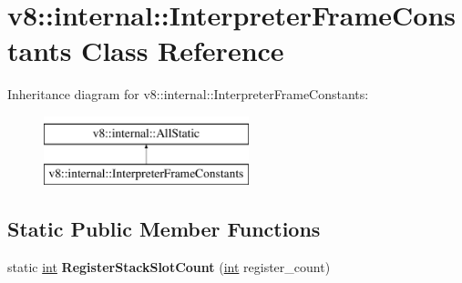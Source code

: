 \hypertarget{classv8_1_1internal_1_1InterpreterFrameConstants}{}\section{v8\+:\+:internal\+:\+:Interpreter\+Frame\+Constants Class Reference}
\label{classv8_1_1internal_1_1InterpreterFrameConstants}
Inheritance diagram for v8\+:\+:internal\+:\+:Interpreter\+Frame\+Constants\+:\begin{figure}[H]
\begin{center}
\leavevmode
\includegraphics[height=2.000000cm]{classv8_1_1internal_1_1InterpreterFrameConstants}
\end{center}
\end{figure}
\subsection*{Static Public Member Functions}
\begin{DoxyCompactItemize}
\item 
\mbox{\label{classv8_1_1internal_1_1InterpreterFrameConstants_a80b1fdef2b7a05386e8efe2b138e4359}} 
static \mbox{\hyperlink{classint}{int}} {\bfseries Register\+Stack\+Slot\+Count} (\mbox{\hyperlink{classint}{int}} register\+\_\+count)
\end{DoxyCompactItemize}
